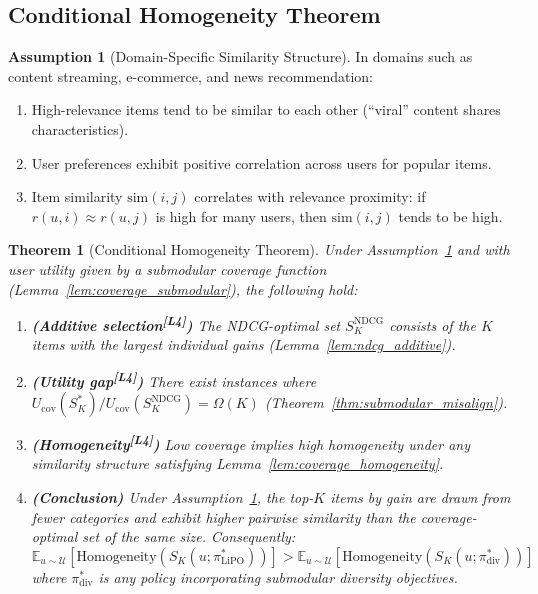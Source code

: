 \documentclass[11pt,a4paper]{article}
\theoremstyle{definition}
\newtheorem{assumption}{Assumption}[section]
\theoremstyle{plain}
\newtheorem{theorem}{Theorem}[section]
\theoremstyle{remark}
\newcommand{\E}{\mathbb{E}}
\newcommand{\NDCG}{\mathrm{NDCG}}
\newcommand{\leanmark}{\textsuperscript{\textcolor{green!50!black}{[L4]}}}
\begin{document}
\subsection{Conditional Homogeneity Theorem}
\label{subsec:h2_statement}

\begin{assumption}[Domain-Specific Similarity Structure]
\label{assump:similarity}
In domains such as content streaming, e-commerce, and news recommendation:
\begin{enumerate}[label=(\alph*)]
    \item High-relevance items tend to be similar to each other (``viral'' content shares characteristics).
    \item User preferences exhibit positive correlation across users for popular items.
    \item Item similarity $\text{sim}(i, j)$ correlates with relevance proximity: if $r(u, i) \approx r(u, j)$ is high for many users, then $\text{sim}(i, j)$ tends to be high.
\end{enumerate}
\end{assumption}

\begin{theorem}[Conditional Homogeneity Theorem]
\label{thm:conditional_homogeneity}
Under Assumption~\ref{assump:similarity} and with user utility given by a submodular coverage function (Lemma~\ref{lem:coverage_submodular}), the following hold:
\begin{enumerate}[label=(\roman*)]
    \item \textbf{(Additive selection\leanmark)} The NDCG-optimal set $S_K^{\NDCG}$ consists of the $K$ items with the largest individual gains (Lemma~\ref{lem:ndcg_additive}).
    \item \textbf{(Utility gap\leanmark)} There exist instances where $U_{\mathrm{cov}}(S_K^*) / U_{\mathrm{cov}}(S_K^{\NDCG}) = \Omega(K)$ (Theorem~\ref{thm:submodular_misalign}).
    \item \textbf{(Homogeneity\leanmark)} Low coverage implies high homogeneity under any similarity structure satisfying Lemma~\ref{lem:coverage_homogeneity}.
    \item \textbf{(Conclusion)} Under Assumption~\ref{assump:similarity}, the top-$K$ items by gain are drawn from fewer categories and exhibit higher pairwise similarity than the coverage-optimal set of the same size. Consequently:
    \begin{equation}
        \E_{u \sim \mathcal{U}}[\mathrm{Homogeneity}(S_K(u; \pi^*_{\text{LiPO}}))] > \E_{u \sim \mathcal{U}}[\mathrm{Homogeneity}(S_K(u; \pi^*_{\text{div}}))]
    \end{equation}
    where $\pi^*_{\text{div}}$ is any policy incorporating submodular diversity objectives.
\end{enumerate}
\end{theorem}
\end{document}
